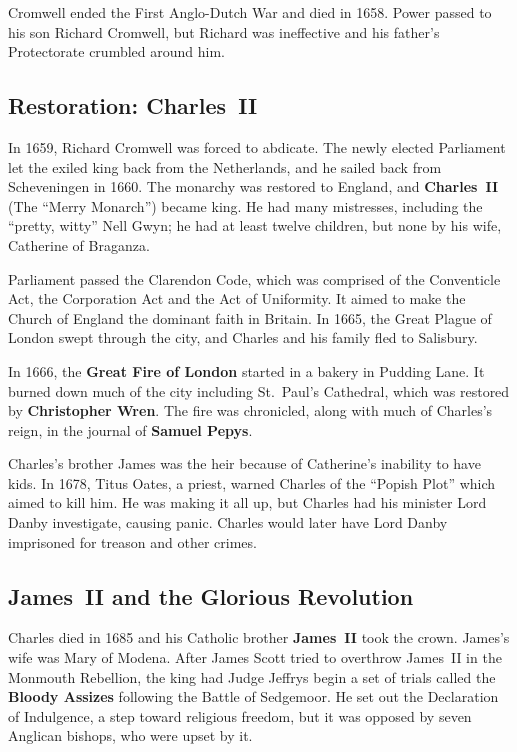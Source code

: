 Cromwell ended the First Anglo-Dutch War and died in 1658.
Power passed to his son Richard Cromwell,
but Richard was ineffective and his father's Protectorate crumbled around him.

\subsection*{Restoration: Charles~II}

In 1659, Richard Cromwell was forced to abdicate.
The newly elected Parliament let the exiled king back from the Netherlands,
and he sailed back from Scheveningen in 1660.
The monarchy was restored to England, and \textbf{Charles~II} (The ``Merry Monarch'') became king.
He had many mistresses, including the ``pretty, witty'' Nell Gwyn;
he had at least twelve children, but none by his wife, Catherine of Braganza.

Parliament passed the Clarendon Code, which was comprised of
the Conventicle Act,
the Corporation Act
and the Act of Uniformity.
It aimed to make the Church of England the dominant faith in Britain.
In 1665, the Great Plague of London swept through the city,
and Charles and his family fled to Salisbury.

In 1666, the \textbf{Great Fire of London} started in a bakery in Pudding Lane.
It burned down much of the city including St.\ Paul's Cathedral, which was restored by \textbf{Christopher Wren}.
The fire was chronicled, along with much of Charles's reign, in the journal of \textbf{Samuel Pepys}.

Charles's brother James was the heir because of Catherine's inability to have kids.
In 1678, Titus Oates, a priest, warned Charles of the ``Popish Plot'' which aimed to kill him.
He was making it all up, but Charles had his minister Lord Danby investigate, causing panic.
Charles would later have Lord Danby imprisoned for treason and other crimes.

\subsection*{James~II and the Glorious Revolution}

Charles died in 1685 and his Catholic brother \textbf{James~II} took the crown.
James's wife was Mary of Modena.
After James Scott tried to overthrow James~II in the Monmouth Rebellion,
the king had Judge Jeffrys begin a set of trials called the \textbf{Bloody Assizes}
following the Battle of Sedgemoor.
He set out the Declaration of Indulgence, a step toward religious freedom,
but it was opposed by seven Anglican bishops, who were upset by it.

